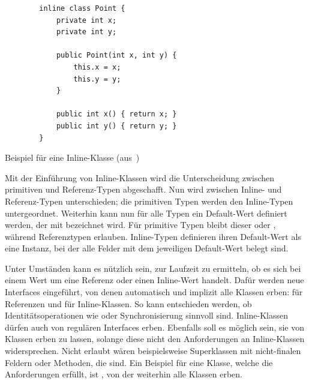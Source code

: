 \begin{listing}
    \begin{verbatim}
        inline class Point {
            private int x;
            private int y;

            public Point(int x, int y) {
                this.x = x;
                this.y = y;
            }

            public int x() { return x; }
            public int y() { return y; }
        }
    \end{verbatim}
    \caption{Beispiel für eine Inline-Klasse (aus~\cite{object-model})}
    \label{inline-class-example}
\end{listing}

Mit der Einführung von Inline-Klassen wird die Unterscheidung zwischen primitiven und Referenz-Typen abgeschafft.
Nun wird zwischen Inline- und Referenz-Typen unterschieden;
die primitiven Typen werden den Inline-Typen untergeordnet.
Weiterhin kann nun für alle Typen ein Default-Wert definiert werden, der mit  bezeichnet wird.
Für primitive Typen bleibt dieser  oder , während Referenztypen  erlauben.
Inline-Typen definieren ihren Default-Wert als eine Instanz, bei der alle Felder mit dem jeweiligen Default-Wert belegt sind.

Unter Umständen kann es nützlich sein, zur Laufzeit zu ermitteln, ob es sich bei einem Wert um eine Referenz oder einen Inline-Wert handelt.
Dafür werden neue Interfaces eingeführt, von denen automatisch und implizit alle Klassen erben:
 für Referenzen und  für Inline-Klassen.
So kann entschieden werden, ob Identitätsoperationen wie \code{==} oder Synchronisierung sinnvoll sind.
Inline-Klassen dürfen auch von regulären Interfaces erben.
Ebenfalls soll es möglich sein, sie von Klassen erben zu lassen, solange diese nicht den Anforderungen an Inline-Klassen widersprechen.
Nicht erlaubt wären beispielsweise Superklassen mit nicht-finalen Feldern oder Methoden, die  sind.
Ein Beispiel für eine Klasse, welche die Anforderungen erfüllt, ist , von der weiterhin alle Klassen erben.


